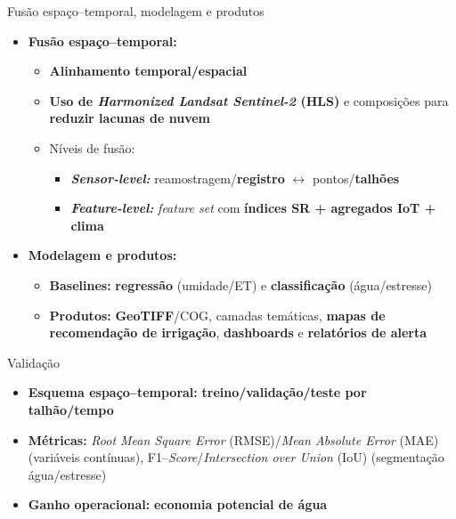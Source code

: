 \documentclass[aspectratio=169]{beamer}
\begin{document}
\begin{frame}{Fusão espaço--temporal, modelagem e produtos}
  \begin{itemize}
    \item \textbf{Fusão espaço--temporal:}
      \begin{itemize}
        \item \textbf{Alinhamento temporal/espacial}
        \item \textbf{Uso de \emph{Harmonized Landsat Sentinel-2} (HLS)} e composições para \textbf{reduzir lacunas de nuvem}
        \item Níveis de fusão:
          \begin{itemize}
            \item \textbf{\emph{Sensor-level:}} reamostragem/\textbf{registro} $\leftrightarrow$ pontos/\textbf{talhões}
            \item \textbf{\emph{Feature-level:}} \emph{feature set} com \textbf{índices SR + agregados IoT + clima}
          \end{itemize}
      \end{itemize}
    \item \textbf{Modelagem e produtos:}
      \begin{itemize}
        \item \textbf{Baselines:} \textbf{regressão} (umidade/ET) e \textbf{classificação} (água/estresse)
        \item \textbf{Produtos:} \textbf{GeoTIFF}/COG, camadas temáticas, \textbf{mapas de recomendação de irrigação}, \textbf{dashboards} e \textbf{relatórios de alerta}
      \end{itemize}
  \end{itemize}
\end{frame}

\begin{frame}{Validação}
  \begin{itemize}
    \item \textbf{Esquema espaço--temporal:} \textbf{treino/validação/teste por talhão/tempo}
    \item \textbf{Métricas:} \emph{Root Mean Square Error} (RMSE)/\emph{Mean Absolute Error} (MAE) (variáveis contínuas), F1--\emph{Score}/\emph{Intersection over Union} (IoU) (segmentação água/estresse)
    \item \textbf{Ganho operacional:} \textbf{economia potencial de água}
  \end{itemize}
\end{frame}
\end{document}
